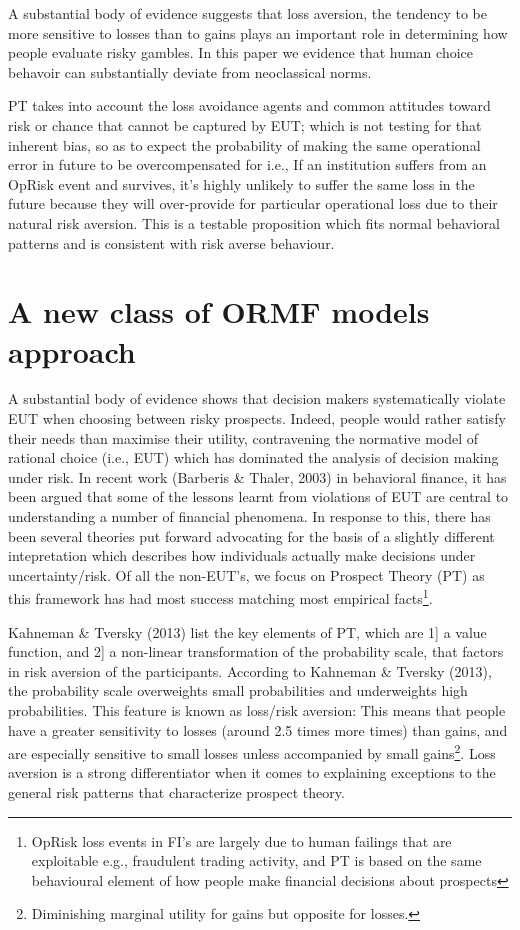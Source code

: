 \documentclass{DissertateUSU}
\begin{document}
A substantial body of evidence suggests that loss aversion, the tendency
to be more sensitive to losses than to gains plays an important role in
determining how people evaluate risky gambles. In this paper we evidence
that human choice behavoir can substantially deviate from neoclassical
norms.\medskip

PT takes into account the loss avoidance agents and common attitudes
toward risk or chance that cannot be captured by EUT; which is not
testing for that inherent bias, so as to expect the probability of
making the same operational error in future to be overcompensated for
i.e., If an institution suffers from an OpRisk event and survives, it's
highly unlikely to suffer the same loss in the future because they will
over-provide for particular operational loss due to their natural risk
aversion. This is a testable proposition which fits normal behavioral
patterns and is consistent with risk averse behaviour.

\section{A new class of ORMF models approach}
\label{sec:A new class of ORMF models approach}

A substantial body of evidence shows that decision makers systematically
violate EUT when choosing between risky prospects. Indeed, people would
rather satisfy their needs than maximise their utility, contravening the
normative model of rational choice (i.e., EUT) which has dominated the
analysis of decision making under risk. In recent work (Barberis \&
Thaler, 2003) in behavioral finance, it has been argued that some of the
lessons learnt from violations of EUT are central to understanding a
number of financial phenomena. In response to this, there has been
several theories put forward advocating for the basis of a slightly
different intepretation which describes how individuals actually make
decisions under uncertainty/risk. Of all the non-EUT's, we focus on
Prospect Theory (PT) as this framework has had most success matching
most empirical
facts\footnote{OpRisk loss events in FI's are largely due to human failings that are exploitable e.g., fraudulent trading activity, and PT is based on the same behavioural element of how people make financial decisions about prospects}.\medskip 

Kahneman \& Tversky (2013) list the key elements of PT, which are 1{]} a
value function, and 2{]} a non-linear transformation of the probability
scale, that factors in risk aversion of the participants. According to
Kahneman \& Tversky (2013), the probability scale overweights small
probabilities and underweights high probabilities. This feature is known
as loss/risk aversion: This means that people have a greater sensitivity
to losses (around 2.5 times more times) than gains, and are especially
sensitive to small losses unless accompanied by small
gains\footnote{Diminishing marginal utility for gains but opposite for losses.}.
Loss aversion is a strong differentiator when it comes to explaining
exceptions to the general risk patterns that characterize prospect
theory.\medskip
\end{document}
